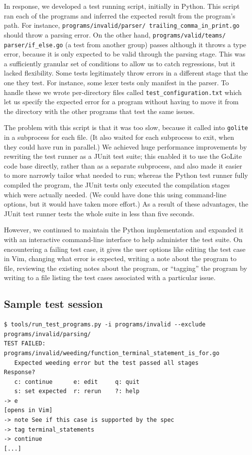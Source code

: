 \documentclass[oneside]{article}
\begin{document}
In response, we developed a test running script, initially in Python. This script ran each of the programs and inferred the expected result from the program's path. For instance, \texttt{programs/invalid/parser/ trailing\_comma\_in\_print.go} should throw a parsing error. On the other hand, \texttt{programs/valid/teams/ parser/if\_else.go} (a test from another group) passes although it throws a type error, because it is only expected to be valid through the parsing stage. This was a sufficiently granular set of conditions to allow us to catch regressions, but it lacked flexibility. Some tests legitimately throw errors in a different stage that the one they test. For instance, some lexer tests only manifest in the parser. To handle these we wrote per-directory files called \texttt{test\_configuration.txt} which let us specify the expected error for a program without having to move it from the directory with the other programs that test the same issues.

The problem with this script is that it was too slow, because it called into \texttt{golite} in a subprocess for each file. (It also waited for each subprocess to exit, when they could have run in parallel.) We achieved huge performance improvements by rewriting the test runner as a JUnit test suite; this enabled it to use the GoLite code base directly, rather than as a separate subprocess, and also made it easier to more narrowly tailor what needed to run; whereas the Python test runner fully compiled the program, the JUnit tests only executed the compilation stages which were actually needed. (We could have done this using command-line options, but it would have taken more effort.) As a result of these advantages, the JUnit test runner tests the whole suite in less than five seconds.

However, we continued to maintain the Python implementation and expanded it with an interactive command-line interface to help administer the test suite. On encountering a failing test case, it gives the user options like editing the test case in Vim, changing what error is expected, writing a note about the program to file, reviewing the existing notes about the program, or ``tagging'' the program by writing to a file listing the test cases associated with a particular issue.

\subsection{Sample test session}
\begin{verbatim}
$ tools/run_test_programs.py -i programs/invalid --exclude programs/invalid/parsing/
TEST FAILED: programs/invalid/weeding/function_terminal_statement_is_for.go
   Expected weeding error but the test passed all stages
Response?
   c: continue      e: edit     q: quit
   s: set expected  r: rerun    ?: help
-> e
[opens in Vim]
-> note See if this case is supported by the spec
-> tag terminal_statements
-> continue
[...]
\end{verbatim}
\end{document}
